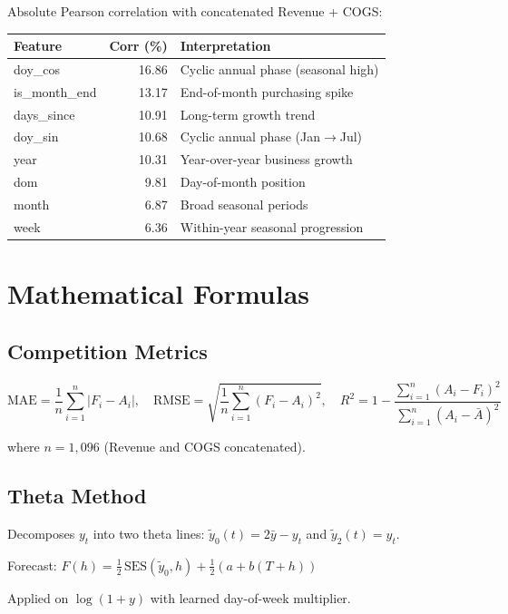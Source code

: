 \documentclass[12pt,a4paper]{article}
\begin{document}
Absolute Pearson correlation with concatenated Revenue + COGS:

\begin{table}[h!]
\centering
\small
\begin{tabular}{lrl}
\toprule
\textbf{Feature} & \textbf{Corr (\%)} & \textbf{Interpretation} \\
\midrule
doy\_cos & 16.86 & Cyclic annual phase (seasonal high) \\
is\_month\_end & 13.17 & End-of-month purchasing spike \\
days\_since & 10.91 & Long-term growth trend \\
doy\_sin & 10.68 & Cyclic annual phase (Jan$\to$Jul) \\
year & 10.31 & Year-over-year business growth \\
dom & 9.81 & Day-of-month position \\
month & 6.87 & Broad seasonal periods \\
week & 6.36 & Within-year seasonal progression \\
\bottomrule
\end{tabular}
\end{table}

\section{Mathematical Formulas}

\subsection{Competition Metrics}

\[
\text{MAE} = \frac{1}{n} \sum_{i=1}^{n} |F_i - A_i|, \quad
\text{RMSE} = \sqrt{\frac{1}{n} \sum_{i=1}^{n} (F_i - A_i)^2}, \quad
R^2 = 1 - \frac{\sum_{i=1}^{n}(A_i - F_i)^2}{\sum_{i=1}^{n}(A_i - \bar{A})^2}
\]

where $n = 1,096$ (Revenue and COGS concatenated).

\subsection{Theta Method}

Decomposes $y_t$ into two theta lines: $\tilde{y}_0(t) = 2\bar{y} - y_t$ and $\tilde{y}_2(t) = y_t$.

Forecast: $F(h) = \tfrac{1}{2}\,\text{SES}(\tilde{y}_0, h) + \tfrac{1}{2}(a + b(T+h))$

Applied on $\log(1+y)$ with learned day-of-week multiplier.
\end{document}
